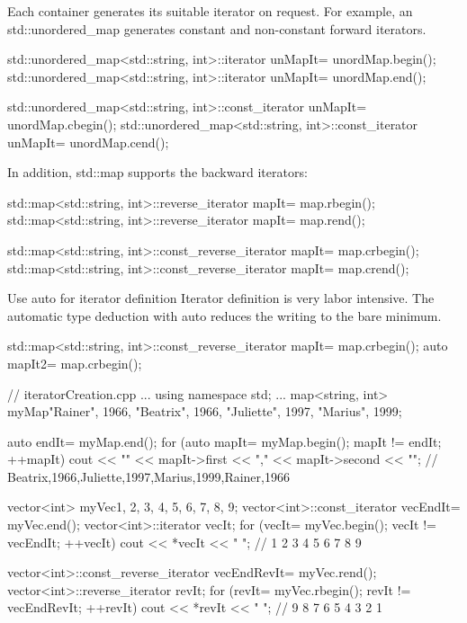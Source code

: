 Each container generates its suitable iterator on request. For example, an std::unordered\_map generates constant and non-constant forward iterators.

\begin{cpp}
std::unordered_map<std::string, int>::iterator unMapIt= unordMap.begin();
std::unordered_map<std::string, int>::iterator unMapIt= unordMap.end();

std::unordered_map<std::string, int>::const_iterator unMapIt= unordMap.cbegin();
std::unordered_map<std::string, int>::const_iterator unMapIt= unordMap.cend();
\end{cpp}

In addition, std::map supports the backward iterators:

\begin{cpp}
std::map<std::string, int>::reverse_iterator mapIt= map.rbegin();
std::map<std::string, int>::reverse_iterator mapIt= map.rend();

std::map<std::string, int>::const_reverse_iterator mapIt= map.crbegin();
std::map<std::string, int>::const_reverse_iterator mapIt= map.crend();
\end{cpp}

\begin{myTip}{Use auto for iterator definition}
Iterator definition is very labor intensive. The automatic type deduction with auto reduces the writing to the bare minimum.

\begin{cpp}
std::map<std::string, int>::const_reverse_iterator
mapIt= map.crbegin();
auto mapIt2= map.crbegin();
\end{cpp}
\end{myTip}


\begin{cpp}
// iteratorCreation.cpp
...
using namespace std;
...
map<string, int> myMap{{"Rainer", 1966}, {"Beatrix", 1966}, {"Juliette", 1997},
						{"Marius", 1999}};
	
auto endIt= myMap.end();
for (auto mapIt= myMap.begin(); mapIt != endIt; ++mapIt)
	cout << "{" << mapIt->first << "," << mapIt->second << "}";
		// {Beatrix,1966},{Juliette,1997},{Marius,1999},{Rainer,1966}

vector<int> myVec{1, 2, 3, 4, 5, 6, 7, 8, 9};
vector<int>::const_iterator vecEndIt= myVec.end();
vector<int>::iterator vecIt;
for (vecIt= myVec.begin(); vecIt != vecEndIt; ++vecIt) cout << *vecIt << " ";
	// 1 2 3 4 5 6 7 8 9

vector<int>::const_reverse_iterator vecEndRevIt= myVec.rend();
vector<int>::reverse_iterator revIt;
for (revIt= myVec.rbegin(); revIt != vecEndRevIt; ++revIt) cout << *revIt << " ";
	// 9 8 7 6 5 4 3 2 1
\end{cpp}



